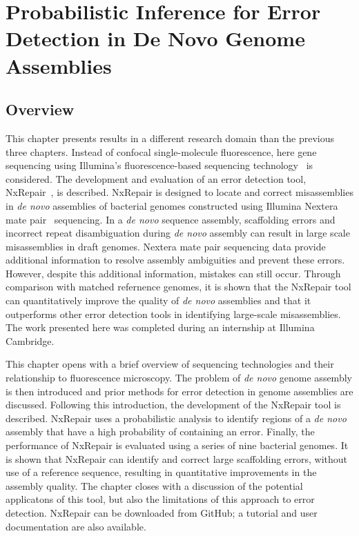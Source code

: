 \chapter{Probabilistic Inference for Error Detection in De Novo Genome Assemblies}
\label{chap:illumina}
\section{Overview}
This chapter presents results in a different research domain than the previous three chapters. Instead of confocal single-molecule  fluorescence, here gene sequencing using Illumina's fluorescence-based sequencing technology~\cite{bentley2008} is considered. The development and evaluation of an error detection tool, NxRepair~\cite{murphy2015}, is described. NxRepair is designed to locate and correct misassemblies in \textit{de novo} assemblies of bacterial genomes constructed using Illumina Nextera mate pair~\cite{nextera2012} sequencing. In a \textit{de novo} sequence assembly, scaffolding errors and incorrect repeat disambiguation during \textit{de novo} assembly can result in large scale misassemblies in draft genomes. Nextera mate pair sequencing data provide additional information to resolve assembly ambiguities and prevent these errors. However, despite this additional information, mistakes can still occur. Through comparison with matched refernence genomes, it is shown that the NxRepair tool can quantitatively improve the quality of \textit{de novo} assemblies and that it outperforms other error detection tools in identifying large-scale misassemblies. The work presented here was completed during an internship at Illumina Cambridge.

This chapter opens with a brief overview of sequencing technologies and their relationship to fluorescence microscopy. The problem of \textit{de novo} genome assembly is then introduced and prior methods for error detection in genome assemblies are discussed. Following this introduction, the development of the NxRepair tool is described. NxRepair uses a probabilistic analysis to identify regions of a \textit{de novo} assembly that have a high probability of containing an error. Finally, the performance of NxRepair is evaluated using a series of nine bacterial genomes. It is shown that NxRepair can identify and correct large scaffolding errors, without use of a reference sequence, resulting in quantitative improvements in the assembly quality. The chapter closes with a discussion of the potential applicatons of this tool, but also the limitations of this approach to error detection. NxRepair can be downloaded from GitHub; a tutorial and user documentation are also available.
 

